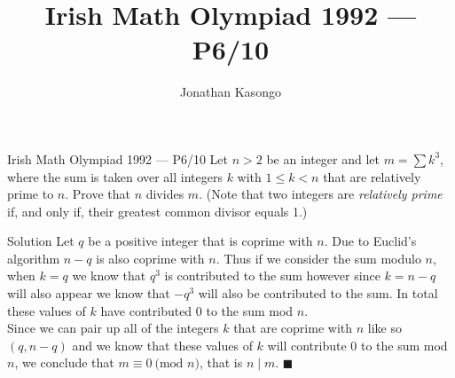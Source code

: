 \documentclass{article}
\author{Jonathan Kasongo}
\title{Irish Math Olympiad 1992 --- P6/10}
\begin{document}
\maketitle

\begin{problem}{Irish Math Olympiad 1992 --- P6/10}
Let $n > 2$ be an integer and let $m = \sum k^3$, where the sum is taken
over all integers $k$ with $1 \leq k < n$ that are relatively prime to $n$.
Prove that $n$ divides $m$. (Note that two integers are
\textit{relatively prime} if, and only if, their greatest common divisor
equals 1.)
\end{problem}

\begin{solution}{Solution}
Let $q$ be a positive integer that is coprime with $n$.
Due to Euclid's algorithm $n-q$ is also coprime with $n$. Thus if we
consider the sum modulo $n$, when $k = q$ we know that $q^3$ is contributed
to the sum however since $k = n-q$ will also appear we know that $-q^3$
will also be contributed to the sum. In total these values of $k$ have
contributed $0$ to the sum mod $n$.\\

Since we can pair up all of the integers $k$ that are coprime with $n$ like
so $(q, n-q)$ and we know that these values of $k$ will contribute 0 to
the sum mod $n$, we conclude that $m \equiv 0 \ \text{(mod } n)$,
that is $n \mid m$. $\blacksquare$
\end{solution}
\end{document}
